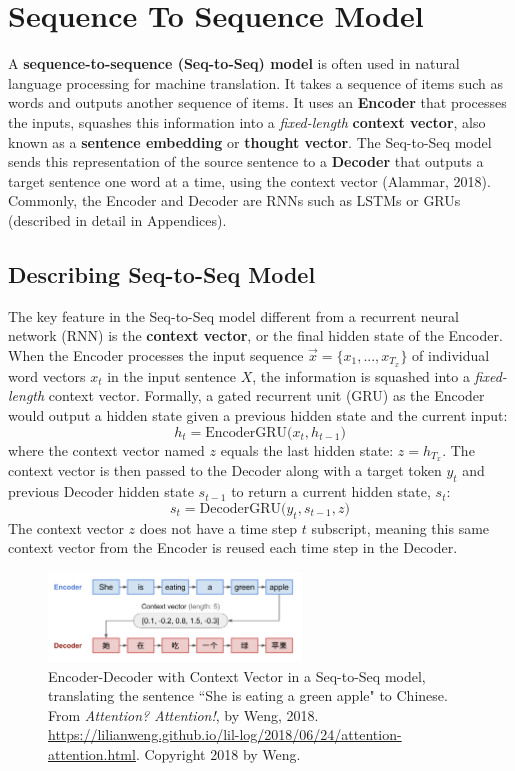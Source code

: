 \section{Sequence To Sequence Model}

A \textbf{sequence-to-sequence (Seq-to-Seq) model} is often used in natural language processing for machine translation. It takes a sequence of items such as words and outputs another sequence of items. It uses an \textbf{Encoder} that processes the inputs, squashes this information into a \emph{fixed-length} \textbf{context vector}, also known as a \textbf{sentence embedding} or \textbf{thought vector}. The Seq-to-Seq model sends this representation of the source sentence to a \textbf{Decoder} that outputs a target sentence one word at a time, using the context vector (Alammar, 2018). Commonly, the Encoder and Decoder are RNNs such as LSTMs or GRUs (described in detail in Appendices).


\subsection{Describing Seq-to-Seq Model}

The key feature in the Seq-to-Seq model different from a recurrent neural network (RNN) is the \textbf{context vector}, or the final hidden state of the Encoder. When the Encoder processes the input sequence $\overrightarrow{x} = \{ x_1, ..., x_{T_x} \}$ of individual word vectors $x_t$ in the input sentence $X$, the information is squashed into a \emph{fixed-length} context vector. Formally, a gated recurrent unit (GRU) as the Encoder would output a hidden state given a previous hidden state and the current input: 
$$
h_t = \text{EncoderGRU} \Big( x_t, h_{t-1} \Big)
$$ 
where the context vector named $z$ equals the last hidden state: $z = h_{T_x}$. 
\newline 
The context vector is then passed to the Decoder along with a target token $y_t$ and previous Decoder hidden state $s_{t-1}$ to return a current hidden state, $s_t$:
$$
s_t = \text{DecoderGRU} \Big( y_t, s_{t-1}, z \Big)
$$
The context vector $z$ does not have a time step $t$ subscript, meaning this same context vector from the Encoder is reused each time step in the Decoder. 


\begin{figure}[h]
\vspace{-5pt}
\centering
\includegraphics[width=0.6\textwidth]{imgs/seqtoseq_greenapple.png}
\vspace{-5pt}
\caption{\footnotesize Encoder-Decoder with Context Vector in a Seq-to-Seq model, translating the sentence ``She is eating a green apple" to Chinese. From \emph{Attention? Attention!}, by Weng, 2018. \url{https://lilianweng.github.io/lil-log/2018/06/24/attention-attention.html}. Copyright 2018 by Weng.}
\vspace{-5pt}
\end{figure}


